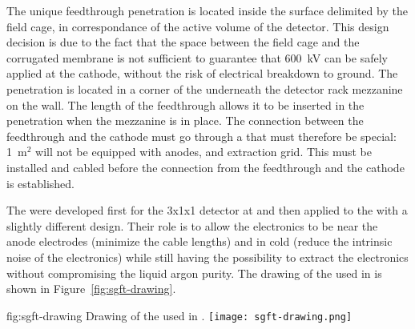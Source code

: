 The unique  feedthrough penetration is located inside the surface delimited by the field cage, in correspondance of the active volume of the detector.
This design decision is due to the fact that the space between the field cage and the corrugated membrane is not sufficient to guarantee that 600~kV can be safely applied at the cathode, without the risk of electrical breakdown to ground.
The penetration is located in a corner of the  underneath the detector rack mezzanine on the  wall.
The length of the feedthrough allows it to be inserted in the penetration when the mezzanine is in place.
The connection between the feedthrough and the cathode must go through a  that must therefore be special: 1~m$^2$ will not be equipped with anodes,  and extraction grid.
This  must be installed and cabled before the connection from the  feedthrough and the cathode is established.

The  were developed first for the 3x1x1 detector at  and then applied to the  with a slightly different design.
Their role is to allow the electronics to be near the anode electrodes (minimize the cable lengths) and in cold (reduce the intrinsic noise of the electronics) while still having the possibility to extract the electronics without compromising the liquid argon purity.
The drawing of the  used in  is shown in Figure~\ref{fig:sgft-drawing}.
\begin{dunefigure}{fig:sgft-drawing}
{Drawing of the  used in .}
\texttt{[image: sgft-drawing.png]}
\end{dunefigure}

